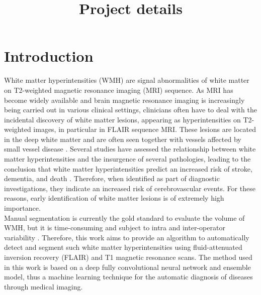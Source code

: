 \documentclass[12pt]{extarticle}
\title{Project details}
\date{}
\providecommand{\abstractname}{Abstract}
\begin{document}


\renewcommand{\abstractname}{Abstract}

\newpage
\section{Introduction}
White matter hyperintensities (WMH) are signal abnormalities of white matter on T2-weighted magnetic resonance imaging (MRI) sequence.
As MRI has become widely available and brain magnetic resonance imaging is increasingly being carried out in various clinical settings, clinicians often have to deal with the incidental discovery of white matter lesions, appearing as hyperintensities on T2-weighted images, in particular in FLAIR sequence MRI.
These lesions are located in the deep white matter and are often seen together with vessels affected by small vessel disease \cite{ventricular_lesions}.
Several studies have assessed the relationship between white matter hyperintensities and the insurgence of several pathologies, leading to the conclusion that white matter hyperintensities predict an increased risk of stroke, dementia, and death \cite{wmh}. Therefore, when identified as part of diagnostic investigations, they indicate an increased risk of cerebrovascular events. 
For these reasons, early identification of white matter lesions is of extremely high importance.\\[4pt]
Manual segmentation is currently the gold standard to evaluate the volume of WMH, but it is time-consuming and subject to intra and inter-operator variability \cite{manual}.
Therefore, this work aims to provide an algorithm to automatically detect and segment such white matter hyperintensities using fluid-attenuated inversion recovery (FLAIR) and T1 magnetic resonance scans.
The method used in this work is based on a deep fully convolutional neural network and ensemble model, thus a machine learning technique for the automatic diagnosis of diseases through medical imaging. 
\end{document}
